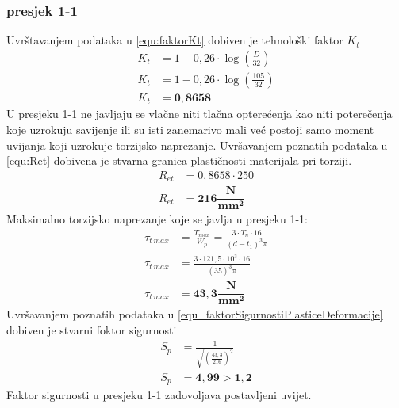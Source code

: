 \documentclass[11pt,a4paper]{report}
\begin{document}
\subsubsection{presjek 1-1}
Uvrštavanjem podataka u \eqref{equ:faktorKt} dobiven je tehnološki faktor $K_t$
\begin{align*}
K_t&=1-0,26\cdot \log \left( \frac{D}{32} \right)\\
K_t&=1-0,26\cdot \log \left( \frac{105}{32} \right)\\
K_t&=\mathbf{0,8658}
\end{align*}
U presjeku 1-1 ne javljaju se vlačne niti tlačna opterećenja kao niti poterečenja koje uzrokuju savijenje ili su isti zanemarivo mali već postoji samo moment uvijanja koji uzrokuje torzijsko naprezanje.
Uvršavanjem poznatih podataka u \eqref{equ:Ret} dobivena je stvarna granica plastičnosti materijala pri torziji.
\begin{align*}
R_{et}&=0,8658 \cdot 250\\
R_{et}&=\mathbf{216 \dfrac{N}{mm^2}}
\end{align*}
Maksimalno torzijsko naprezanje koje se javlja u presjeku 1-1:
\begin{align*}
\tau_{t \, max}&=\frac{T_{max}}{W_p}=\frac{3 \cdot T_n \cdot 16}{(d-t_1)^3 \pi}\\
\tau_{t \, max}&=\frac{3 \cdot 121,5\cdot 10^3 \cdot 16}{(35)^3 \pi}\\
\tau_{t \, max}&=\mathbf{43,3 \dfrac{N}{mm^2}}
\end{align*}
Uvršavanjem poznatih podataka u \eqref{equ_faktorSigurnostiPlasticeDeformacije} dobiven je stvarni foktor sigurnosti
\begin{align*}
S_p&=\frac{1}{\sqrt{\left(\frac{43,3}{216}\right)^2}}\\
S_p&=\mathbf{4,99 > 1,2}
\end{align*}
Faktor sigurnosti u presjeku 1-1 zadovoljava postavljeni uvijet.
\end{document}
